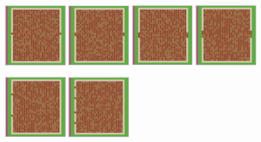 \documentclass[12pt,letterpaper]{article}
\begin{document}
\begin{figure}[ht]
  \begin{minipage}[b]{.75\linewidth}
    \includegraphics[width=0.24\textwidth]{./figures/exit_dims_2_b.png}
    \includegraphics[width=0.24\textwidth]{./figures/exit_dims_4_b.png}
    \includegraphics[width=0.24\textwidth]{./figures/exit_dims_6_b.png}
    \includegraphics[width=0.24\textwidth]{./figures/exit_dims_8_b.png}
  \end{minipage}
  \begin{minipage}[b]{.75\linewidth}
    \includegraphics[width=0.24\textwidth]{./figures/exit_dims_2_c.png}
    \includegraphics[width=0.24\textwidth]{./figures/exit_dims_4_c.png}

\end{minipage}
\end{figure}
\end{document}

